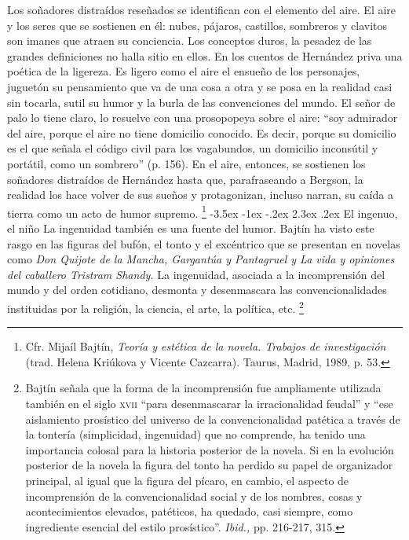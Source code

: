 \documentclass[14pt,twoside,final]{extbook} %
\makeatletter
\let\oldfootnote\footnote
\renewcommand\footnote[1]{%
\oldfootnote{\hspace{1mm}#1}}
\renewcommand\section{\@startsection {section}{1}{\z@}%
                                     {-3.5ex \@plus -1ex \@minus -.2ex}%
                                     {2.3ex \@plus .2ex}%
                                     {\normalfont\large\bfseries\sc}}
\makeatother
\begin{document}
Los soñadores distraídos reseñados se identifican con el elemento del aire. El aire y los seres que se sostienen en él: nubes, pájaros, castillos, sombreros y clavitos son imanes que atraen su conciencia. Los conceptos duros, la pesadez de las grandes definiciones no halla sitio en ellos. En los cuentos de Hernández priva una poética de la ligereza. Es ligero como el aire el ensueño de los personajes, juguetón su pensamiento que va de una cosa a otra y se posa en la realidad casi sin tocarla, sutil su humor y la burla de las convenciones del mundo. El señor de palo lo tiene claro, lo resuelve con una prosopopeya sobre el aire: ``soy admirador del aire, porque el aire no tiene domicilio conocido. Es decir, porque su domicilio es el que señala el código civil para los vagabundos, un domicilio inconsútil y portátil, como un sombrero'' (p. 156). En el aire, entonces, se sostienen los soñadores distraídos de Hernández hasta que, parafraseando a Bergson, la realidad los hace volver de sus sueños y protagonizan, incluso narran, su caída a tierra como un acto de humor supremo.\footnote{Cfr. Mijaíl Bajtín, \emph{Teoría y estética de la novela. Trabajos de investigación} (trad. Helena Kriúkova y Vicente Cazcarra). Taurus, Madrid, 1989, p. 53.}
\section{El ingenuo, el niño}\label{sec:el-ingenuo-el-nino}
La ingenuidad también es una fuente del humor. Bajtín ha visto este rasgo en las figuras del bufón, el tonto y el excéntrico que se presentan en novelas como \textit{Don Quijote de la Mancha, Gargantúa y Pantagruel \emph{y} La vida y opiniones del caballero Tristram Shandy.} La ingenuidad, asociada a la incomprensión del mundo y del orden cotidiano, desmonta y desenmascara las convencionalidades instituidas por la religión, la ciencia, el arte, la política, etc.\footnote{Bajtín señala que la forma de la incomprensión fue ampliamente utilizada también en el siglo \textsc{xvii} ``para desenmascarar la irracionalidad feudal'' y ``ese aislamiento prosístico del universo de la convencionalidad patética a través de la tontería (simplicidad, ingenuidad) que no comprende, ha tenido una importancia colosal para la historia posterior de la novela. Si en la evolución posterior de la novela la figura del tonto ha perdido su papel de organizador principal, al igual que la figura del pícaro, en cambio, el aspecto de incomprensión de la convencionalidad social y de los nombres, cosas y acontecimientos elevados, patéticos, ha quedado, casi siempre, como ingrediente esencial del estilo prosístico''. \emph{Ibid.,} pp. 216-217, 315.}
\end{document}
